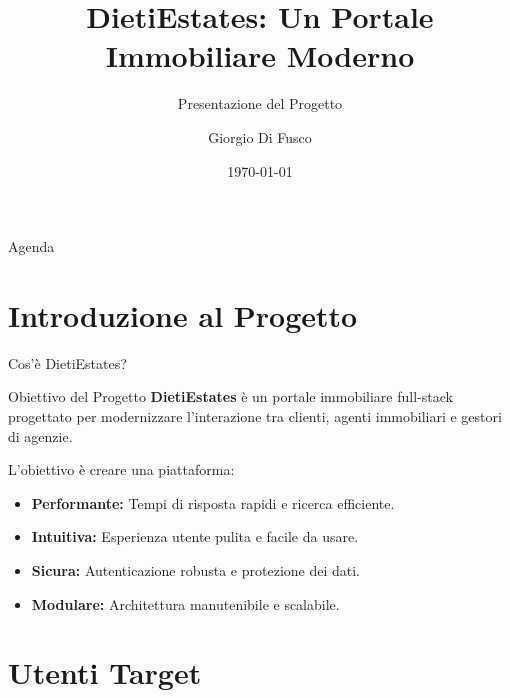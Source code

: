 \documentclass[10pt]{beamer}
\title{DietiEstates: Un Portale Immobiliare Moderno}
\subtitle{Presentazione del Progetto}
\author{Giorgio Di Fusco}
\institute{Università degli Studi di Napoli Federico II}
\date{\today}
\begin{document}
\begin{frame}
    \titlepage
\end{frame}

\begin{frame}{Agenda}
    \tableofcontents
\end{frame}

\section{Introduzione al Progetto}

\begin{frame}{Cos'è DietiEstates?}
    \begin{block}{Obiettivo del Progetto}
        \textbf{DietiEstates} è un portale immobiliare full-stack progettato per modernizzare l'interazione tra clienti, agenti immobiliari e gestori di agenzie.
        \vspace{1em}

        L'obiettivo è creare una piattaforma:
        \begin{itemize}
            \item \textbf{Performante:} Tempi di risposta rapidi e ricerca efficiente.
            \item \textbf{Intuitiva:} Esperienza utente pulita e facile da usare.
            \item \textbf{Sicura:} Autenticazione robusta e protezione dei dati.
            \item \textbf{Modulare:} Architettura manutenibile e scalabile.
        \end{itemize}
    \end{block}
\end{frame}

\section{Utenti Target}
\end{document}
